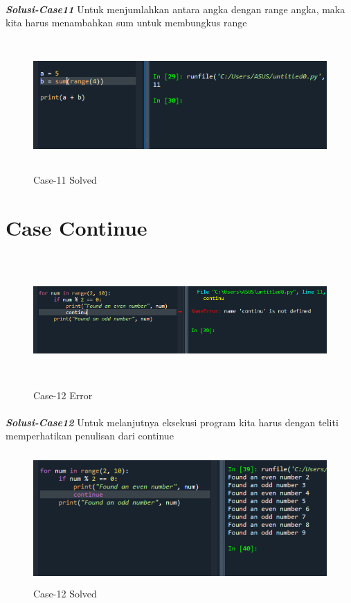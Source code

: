 \documentclass[12pt,a4paper]{article}
\begin{document}
\paragraph{}\textbf{\textit{Solusi-Case11}} {Untuk menjumlahkan antara angka dengan range angka, maka kita harus menambahkan sum untuk membungkus range}
\begin{figure}[ht]
    \centerline{\includegraphics[width=15cm,height=5cm]{image/case11-solved.png}}
    \renewcommand{\figurename}{Gambar}
    \caption{Case-11 Solved}
\end{figure}

\newpage
\section{Case Continue}
\begin{figure}[ht]
    \centerline{\includegraphics[width=15cm,height=5cm]{image/case12.png}}
    \renewcommand{\figurename}{Gambar}
    \caption{Case-12 Error}
\end{figure}
\paragraph{}\textbf{\textit{Solusi-Case12}} {Untuk melanjutnya eksekusi program kita harus dengan teliti memperhatikan penulisan dari continue}
\begin{figure}[ht]
    \centerline{\includegraphics[width=15cm,height=5cm]{image/case12-solved.png}}
    \renewcommand{\figurename}{Gambar}
    \caption{Case-12 Solved}
\end{figure}
\end{document}
